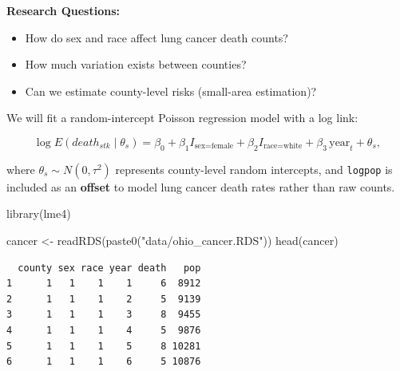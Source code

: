 \documentclass[
  letterpaper,
  DIV=11,
  numbers=noendperiod]{scrreprt}
\newenvironment{Shaded}{\begin{snugshade}}{\end{snugshade}}
\newcommand{\AttributeTok}[1]{\textcolor[rgb]{0.40,0.45,0.13}{#1}}
\newcommand{\CommentTok}[1]{\textcolor[rgb]{0.37,0.37,0.37}{#1}}
\newcommand{\DecValTok}[1]{\textcolor[rgb]{0.68,0.00,0.00}{#1}}
\newcommand{\FunctionTok}[1]{\textcolor[rgb]{0.28,0.35,0.67}{#1}}
\newcommand{\NormalTok}[1]{\textcolor[rgb]{0.00,0.23,0.31}{#1}}
\newcommand{\OtherTok}[1]{\textcolor[rgb]{0.00,0.23,0.31}{#1}}
\newcommand{\SpecialCharTok}[1]{\textcolor[rgb]{0.37,0.37,0.37}{#1}}
\newcommand{\StringTok}[1]{\textcolor[rgb]{0.13,0.47,0.30}{#1}}
\begin{document}
\textbf{Research Questions:}

\begin{itemize}
\item
  How do sex and race affect lung cancer death counts?
\item
  How much variation exists between counties?
\item
  Can we estimate county-level risks (small-area estimation)?
\end{itemize}

We will fit a random-intercept Poisson regression model with a log link:

\[
\log E(death_{stk} \mid \theta_s) = \beta_0 + \beta_1 I_{\text{sex} = \text{female}} + \beta_2 I_{\text{race} = \text{white}} + \beta_3 \, \text{year}_t + \theta_s,
\]

where \(\theta_s \sim N(0, \tau^2)\) represents county-level random
intercepts, and \texttt{logpop} is included as an \textbf{offset} to
model lung cancer death rates rather than raw counts.

\begin{Shaded}
\begin{Highlighting}[]
\FunctionTok{library}\NormalTok{(lme4)}

\NormalTok{cancer }\OtherTok{\textless{}{-}} \FunctionTok{readRDS}\NormalTok{(}\FunctionTok{paste0}\NormalTok{(}\StringTok{"data/ohio\_cancer.RDS"}\NormalTok{))}
\FunctionTok{head}\NormalTok{(cancer)}
\end{Highlighting}
\end{Shaded}

\begin{verbatim}
  county sex race year death   pop
1      1   1    1    1     6  8912
2      1   1    1    2     5  9139
3      1   1    1    3     8  9455
4      1   1    1    4     5  9876
5      1   1    1    5     8 10281
6      1   1    1    6     5 10876
\end{verbatim}

\begin{Shaded}
\end{Shaded}
\end{document}
